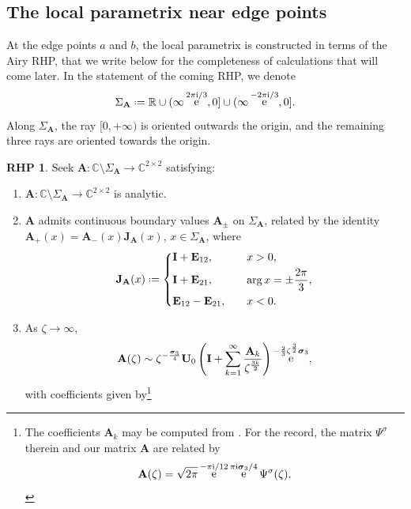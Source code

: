 \documentclass[reqno,a4paper,11pt]{amsart}
\DeclareMathOperator{\ee}{\rm e}
\newcommand{\C}{\mathbb{C}}
\newcommand{\R}{\mathbb{R}}
\newcommand{\ii}{\mathrm{i}}
\newcommand*{\deff}{\mathrel{\vcenter{\baselineskip0.5ex \lineskiplimit0pt
                     \hbox{\scriptsize.}\hbox{\scriptsize.}}}%
                     =}
\renewcommand{\bm}{\mathbf}
\renewcommand{\sp}{\boldsymbol \sigma}
\theoremstyle{definition}
\newtheorem{rhp}[theorem]{RHP}
\theoremstyle{remark}
\numberwithin{equation}{section}
\newcommand*{\defeq}{\mathrel{\vcenter{\baselineskip0.5ex \lineskiplimit0pt
                     \hbox{\scriptsize.}\hbox{\scriptsize.}}}%
                     =}
\begin{document}
\subsection{The local parametrix near edge points}\hfill 

At the edge points $a$ and $b$, the local parametrix is constructed in terms of the Airy RHP, that we write below for the completeness of calculations that will come later. In the statement of the coming RHP, we denote
%
$$
\Sigma_{\bm A} \defeq \R\cup (\infty\ee^{2\pi \ii /3},0]\cup (\infty \ee^{-2\pi \ii/3}, 0].
$$
%
Along $\Sigma_{\bm A}$, the ray $[0,+\infty)$ is oriented outwards the origin, and the remaining three rays are oriented towards the origin.

\begin{rhp}\label{rhp:airy}
    Seek $\bm A:\C \setminus \Sigma_{\bm A} \to \C^{2 \times 2}$ satisfying:
    \begin{enumerate}[\rm (i)]
        \item $\bm A: \C \setminus \Sigma_{\bm A} \to \C^{2 \times 2}$ is analytic.
        \item $\bm A$ admits continuous boundary values $\bm A_{\pm}$ on $\Sigma_{\bm A}$, related by the identity $\bm A_+(x) = \bm A_-(x) \bm J_{\bm A}(x)$, $x\in \Sigma_{\bm A}$, where
        \[
            \bm{J}_{\bm A}(x) \deff 
                \begin{dcases}
                    \bm I + \bm E_{12}, \quad &x>0, \\
                    \bm I +\bm E_{21}, \quad &\arg x =  \pm\frac{2 \pi }{3}, \\
                    \bm E_{12} - \bm E_{21}, \quad &x<0.
                \end{dcases}
        \]
        \item As $\zeta \to \infty$,
        \begin{equation}\label{eq:airy_asymptotics}
            \bm A(\zeta) \sim  \zeta^{-\frac{\sp_3}{4}} \bm U_0 \left( \bm I + 
            \sum_{k=1}^\infty \frac{\bm A_k}{\zeta^{\frac{3k}{2}}} \right) \ee^{-\frac{2}{3}\zeta^{\frac{3}{2}} \sp_3},
        \end{equation}
        with coefficients given by\footnote{The coefficients $\bm A_k$ may be computed from \cite[Equation~(7.30)]{deift_exp_weights}. For the record, the matrix $\Psi^\sigma$ therein and our matrix $\bm A$ are related by
        \[
        \bm A(\zeta)=\sqrt{2\pi}\ee^{-\pi \ii /12}\ee^{\pi \ii \sp_3/4}\Psi^\sigma(\zeta).
\]}
\end{enumerate}
\end{rhp}
\end{document}
